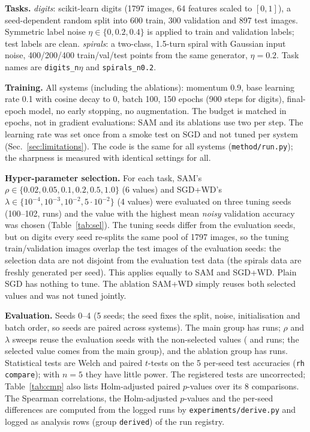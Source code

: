\textbf{Tasks.} \emph{digits}: scikit-learn digits (1797 images, 64 features scaled to $[0,1]$), a seed-dependent random split into 600 train, 300 validation and 897 test images. Symmetric label noise $\eta\in\{0,0.2,0.4\}$ is applied to train and validation labels; test labels are clean. \emph{spirals}: a two-class, 1.5-turn spiral with Gaussian input noise, 400/200/400 train/val/test points from the same generator, $\eta=0.2$. Task names are \texttt{digits\_n}$\eta$ and \texttt{spirals\_n0.2}.

\textbf{Training.} All systems (including the ablations): momentum 0.9, base learning rate 0.1 with cosine decay to 0, batch 100, 150 epochs (900 steps for digits), final-epoch model, no early stopping, no augmentation. The budget is matched in epochs, not in gradient evaluations: SAM and its ablations use two per step. The learning rate was set once from a smoke test on SGD and not tuned per system (Sec.~\ref{sec:limitations}). The code is the same for all systems (\texttt{method/run.py}); the sharpness is measured with identical settings for all.

\textbf{Hyper-parameter selection.} For each task, SAM's $\rho\in\{0.02,0.05,0.1,0.2,0.5,1.0\}$ (6 values) and SGD+WD's $\lambda\in\{10^{-4},10^{-3},10^{-2},5\cdot10^{-2}\}$ (4 values) were evaluated on three tuning seeds (100--102,  runs) and the value with the highest mean \emph{noisy} validation accuracy was chosen (Table~\ref{tab:sel}). The tuning seeds differ from the evaluation seeds, but on digits every seed re-splits the same pool of 1797 images, so the tuning train/validation images overlap the test images of the evaluation seeds: the selection data are not disjoint from the evaluation test data (the spirals data are freshly generated per seed). This applies equally to SAM and SGD+WD. Plain SGD has nothing to tune. The ablation SAM+WD simply reuses both selected values and was not tuned jointly.

\textbf{Evaluation.} Seeds 0--4 (5 seeds; the seed fixes the split, noise, initialisation and batch order, so seeds are paired across systems). The main group has  runs; $\rho$ and $\lambda$ sweeps reuse the evaluation seeds with the non-selected values ( and  runs; the selected value comes from the main group), and the ablation group has  runs. Statistical tests are Welch and paired $t$-tests on the 5 per-seed test accuracies (\texttt{rh compare}); with $n=5$ they have little power. The registered tests are uncorrected; Table~\ref{tab:cmp} also lists Holm-adjusted paired $p$-values over its 8 comparisons. The Spearman correlations, the Holm-adjusted $p$-values and the per-seed differences are computed from the logged runs by \texttt{experiments/derive.py} and logged as  analysis rows (group \texttt{derived}) of the run registry.

